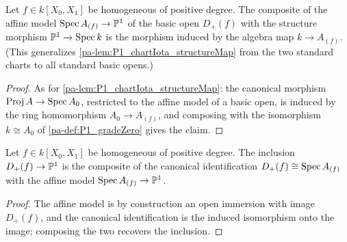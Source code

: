 \begin{lemma}
  \label{pa-lem:P1_awayi_structureMap}
  \leanok

  Let \(f \in k[X_0, X_1]\) be homogeneous of positive degree. The composite of the affine
  model \(\operatorname{Spec} A_{(f)} \to \mathbb{P}^1\) of the basic open \(D_+(f)\) with the structure
  morphism \(\mathbb{P}^1 \to \operatorname{Spec} k\) is the morphism induced by the algebra map
  \(k \to A_{(f)}\). (This generalizes \ref{pa-lem:P1_chartIota_structureMap} from the two
  standard charts to all standard basic opens.)
\end{lemma}
\begin{proof}
  \leanok
  As for \ref{pa-lem:P1_chartIota_structureMap}: the canonical morphism
  \(\operatorname{Proj} A \to \operatorname{Spec} A_0\), restricted to the affine model of a basic open, is induced by
  the ring homomorphism \(A_0 \to A_{(f)}\), and composing with the isomorphism
  \(k \cong A_0\) of \ref{pa-def:P1_gradeZero} gives the claim.
\end{proof}

\begin{lemma}
  \label{pa-lem:P1_basicOpen_iota_eq}
  \leanok

  Let \(f \in k[X_0, X_1]\) be homogeneous of positive degree. The inclusion
  \(D_+(f) \to \mathbb{P}^1\) is the composite of the canonical identification
  \(D_+(f) \cong \operatorname{Spec} A_{(f)}\) with the affine model \(\operatorname{Spec} A_{(f)} \to \mathbb{P}^1\).
\end{lemma}
\begin{proof}
  \leanok
  The affine model is by construction an open immersion with image \(D_+(f)\), and the
  canonical identification is the induced isomorphism onto the image; composing the two
  recovers the inclusion.
\end{proof}


